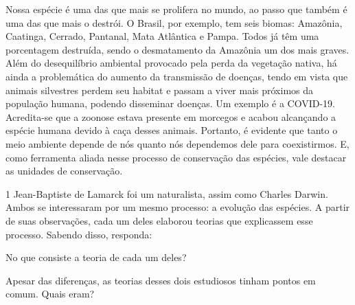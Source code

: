 {{{Nossa espécie é uma das que mais se prolifera no mundo, ao passo que
também é uma das que mais o destrói. O Brasil, por exemplo, tem seis biomas: Amazônia, Caatinga, Cerrado, Pantanal, Mata Atlântica e Pampa. Todos
já têm uma porcentagem destruída, sendo o desmatamento da Amazônia um
dos mais graves. Além do desequilíbrio ambiental provocado pela perda da
vegetação nativa, há ainda a problemática do aumento da transmissão de
doenças, tendo em vista que animais silvestres perdem seu habitat e
passam a viver mais próximos da população humana, podendo disseminar
doenças. Um exemplo é a COVID-19. Acredita-se que a zoonose estava
presente em morcegos e acabou alcançando a espécie humana devido à caça
desses animais. Portanto, é evidente que tanto o meio ambiente depende
de nós quanto nós dependemos dele para coexistirmos. E, como ferramenta
aliada nesse processo de conservação das espécies, vale destacar as
unidades de conservação.}


\num{1} Jean-Baptiste de Lamarck foi um naturalista, assim como Charles
  Darwin. Ambos se interessaram por um mesmo processo: a evolução das
  espécies. A partir de suas observações, cada um deles elaborou teorias
  que explicassem esse processo. Sabendo disso, responda:

\begin{escolha}
\item No que consiste a teoria de cada um deles?



\item Apesar das diferenças, as teorias desses dois estudiosos tinham pontos em comum. Quais eram?


\end{escolha}}}
